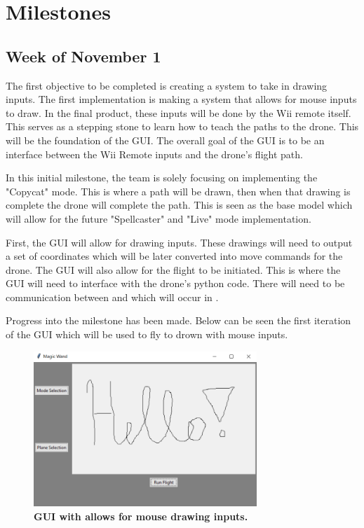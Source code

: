 \documentclass[conf]{new-aiaa}
\begin{document}
\section{Milestones}

    \subsection{Week of November 1}
    
        The first objective to be completed is creating a system to take in drawing inputs. The first implementation is making a system that allows for mouse inputs to draw. In the final product, these inputs will be done by the Wii remote itself. This serves as a stepping stone to learn how to teach the paths to the drone. This will be the foundation of the GUI. The overall goal of the GUI is to be an interface between the Wii Remote inputs and the drone's flight path. 
        
        In this initial milestone, the team is solely focusing on implementing the "Copycat" mode. This is where a path will be drawn, then when that drawing is complete the drone will complete the path. This is seen as the base model which will allow for the future "Spellcaster" and "Live" mode implementation.
        
        First, the GUI will allow for drawing inputs. These drawings will need to output a set of coordinates which will be later converted into move commands for the drone. The GUI will also allow for the flight to be initiated. This is where the GUI will need to interface with the drone's python code. There will need to be communication between  and  which will occur in . 
        
        Progress into the milestone has been made. Below can be seen the first iteration of the GUI which will be used to fly to drown with mouse inputs. 
        
        \begin{figure}[H]
        \centering
        \includegraphics[width=0.75\textwidth]{docs/reports/Project Update 3/images/GUI.PNG}
        \caption{\textbf{GUI with allows for mouse drawing inputs.}}
        \label{fig:H_spectrum}
        \end{figure}
\end{document}
